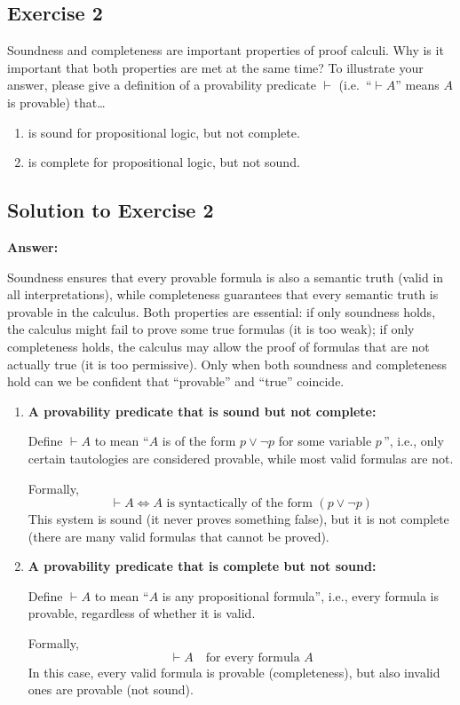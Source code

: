 \documentclass[11pt]{article}
\begin{document}
    
    \subsection*{Exercise 2}

    Soundness and completeness are important properties of proof calculi.
    Why is it important that both properties are met at the same time?
    To illustrate your answer, please give a definition of a provability predicate $\vdash$ (i.e.\ ``$\vdash A$'' means $A$ is provable) that\ldots

    \begin{enumerate}
        \item is sound for propositional logic, but not complete.
        \item is complete for propositional logic, but not sound.
    \end{enumerate}

    \subsection*{Solution to Exercise 2}

    \textbf{Answer:}

    Soundness ensures that every provable formula is also a semantic truth (valid in all interpretations),
    while completeness guarantees that every semantic truth is provable in the calculus.
    Both properties are essential:
    if only soundness holds,
    the calculus might fail to prove some true formulas (it is too weak);
    if only completeness holds,
    the calculus may allow the proof of formulas that are not actually true (it is too permissive).
    Only when both soundness and completeness hold can we be confident that ``provable'' and ``true'' coincide.

    \begin{enumerate}
        \item \textbf{A provability predicate that is sound but not complete:}

        Define $\vdash A$ to mean ``$A$ is of the form $p \vee \neg p$ for some variable $p$\,'', i.e., only certain tautologies are considered provable, while most valid formulas are not.

        Formally,
        $$
        \vdash A \iff A \text{ is syntactically of the form } (p \vee \neg p)
        $$
        This system is sound (it never proves something false), but it is not complete (there are many valid formulas that cannot be proved).

        \item \textbf{A provability predicate that is complete but not sound:}

        Define $\vdash A$ to mean ``$A$ is any propositional formula'', i.e., every formula is provable, regardless of whether it is valid.

        Formally,
        $$
        \vdash A \quad \text{for every formula } A
        $$
        In this case, every valid formula is provable (completeness), but also invalid ones are provable (not sound).
    \end{enumerate}
\end{document}
